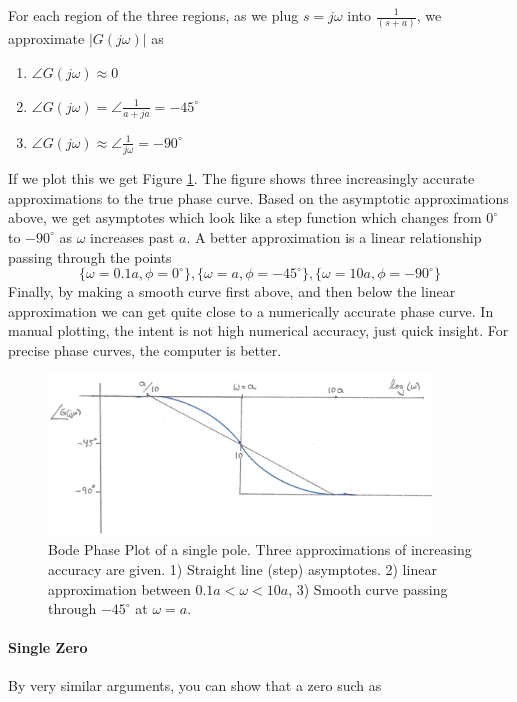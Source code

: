 For each region of the three regions,
as we plug  $s=j\omega$ into $ \frac{1}{(s+a)}$, we   approximate $|G(j\omega)|$ as

\begin{enumerate}
  \item  $\angle G(j\omega)   \approx 0$
  \item  $\angle G(j\omega) = \angle \frac{1}{a+ja}   =  -45^\circ $
  \item  $\angle G(j\omega) \approx \angle  \frac{1}{j\omega}  = -90^\circ$
\end{enumerate}


If we plot this we get Figure \ref{BodePhaseOnePole}. The figure shows three increasingly accurate approximations to the true phase curve.  Based on the asymptotic approximations above, we get asymptotes which look like a step function which changes from $0^\circ$ to $-90^\circ$ as $\omega$ increases past $a$.
A better approximation is a linear relationship passing through the points
\[
\{\omega=0.1a, \phi = 0^\circ\}, \{\omega=a, \phi = -45^\circ\}, \{\omega=10a, \phi=-90^\circ\}
\]
Finally, by making a smooth curve first above, and then below the linear approximation we can get quite close to a numerically accurate phase curve.  In manual plotting, the intent is not high numerical accuracy, just quick insight.   For precise phase curves, the computer is better.

\begin{figure}\centering
\includegraphics[width=4.0in]{figs05/00757a.png}
\caption{Bode Phase Plot of a single pole. Three approximations of increasing accuracy are given.  1) Straight line (step) asymptotes.  2) linear approximation between $0.1a < \omega < 10a$, 3) Smooth curve passing through $-45^\circ$ at $\omega=a$.}\label{BodePhaseOnePole}
\end{figure}

\paragraph{Single Zero}
By very similar arguments, you can show that a zero such as

